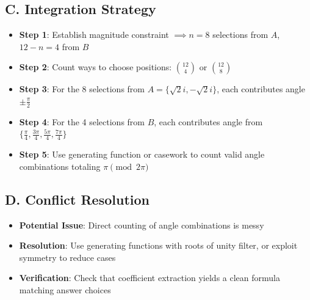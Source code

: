 \documentclass[]{article}
\begin{document}
\begin{techniquesbox}
\subsection*{C. Integration Strategy}
\begin{itemize}[leftmargin=*]
    \item \textbf{Step 1}: Establish magnitude constraint $\implies n = 8$ selections from $A$, $12-n=4$ from $B$
    \item \textbf{Step 2}: Count ways to choose positions: $\binom{12}{4}$ or $\binom{12}{8}$
    \item \textbf{Step 3}: For the 8 selections from $A = \{\sqrt{2}i, -\sqrt{2}i\}$, each contributes angle $\pm\frac{\pi}{2}$
    \item \textbf{Step 4}: For the 4 selections from $B$, each contributes angle from $\{\frac{\pi}{4}, \frac{3\pi}{4}, \frac{5\pi}{4}, \frac{7\pi}{4}\}$
    \item \textbf{Step 5}: Use generating function or casework to count valid angle combinations totaling $\pi \pmod{2\pi}$
\end{itemize}

\subsection*{D. Conflict Resolution}
\begin{itemize}[leftmargin=*]
    \item \textbf{Potential Issue}: Direct counting of angle combinations is messy
    \item \textbf{Resolution}: Use generating functions with roots of unity filter, or exploit symmetry to reduce cases
    \item \textbf{Verification}: Check that coefficient extraction yields a clean formula matching answer choices
\end{itemize}
\end{techniquesbox}
\end{document}
